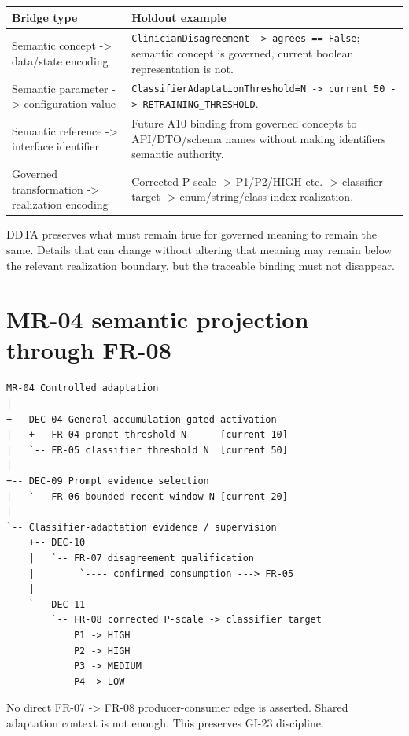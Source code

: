\documentclass[11pt,a4paper]{article}
\begin{document}
\begin{tabularx}{\textwidth}{L{45mm}Y}\toprule
\textbf{Bridge type} & \textbf{Holdout example}\\\midrule
Semantic concept -> data/state encoding & \texttt{ClinicianDisagreement -> agrees == False}; semantic concept is governed, current boolean representation is not.\\
Semantic parameter -> configuration value & \texttt{ClassifierAdaptationThreshold=N -> current 50 -> RETRAINING\_THRESHOLD}.\\
Semantic reference -> interface identifier & Future A10 binding from governed concepts to API/DTO/schema names without making identifiers semantic authority.\\
Governed transformation -> realization encoding & Corrected P-scale -> P1/P2/HIGH etc. -> classifier target -> enum/string/class-index realization.\\
\bottomrule\end{tabularx}

\begin{ddtaprinciple}[title={Candidate general rule}]
DDTA preserves what must remain true for governed meaning to remain the same. Details that can change without altering that meaning may remain below the relevant realization boundary, but the traceable binding must not disappear.
\end{ddtaprinciple}

\section{MR-04 semantic projection through FR-08}
\begin{lstlisting}
MR-04 Controlled adaptation
|
+-- DEC-04 General accumulation-gated activation
|   +-- FR-04 prompt threshold N      [current 10]
|   `-- FR-05 classifier threshold N  [current 50]
|
+-- DEC-09 Prompt evidence selection
|   `-- FR-06 bounded recent window N [current 20]
|
`-- Classifier-adaptation evidence / supervision
    +-- DEC-10
    |   `-- FR-07 disagreement qualification
    |        `---- confirmed consumption ---> FR-05
    |
    `-- DEC-11
        `-- FR-08 corrected P-scale -> classifier target
            P1 -> HIGH
            P2 -> HIGH
            P3 -> MEDIUM
            P4 -> LOW
\end{lstlisting}

No direct FR-07 -> FR-08 producer-consumer edge is asserted. Shared adaptation context is not enough. This preserves GI-23 discipline.
\end{document}
